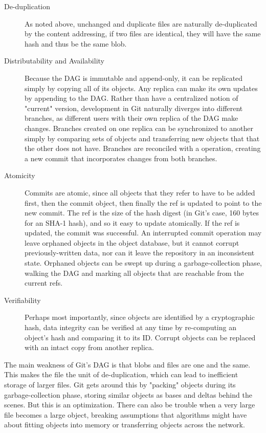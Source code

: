 \begin{description}

    \item[De-duplication] As noted above, unchanged and duplicate files are
        naturally de-duplicated by the content addressing, if two files are
        identical, they will have the same hash and thus be the same blob.

    \item[Distributability and Availability] Because the DAG is immutable and
        append-only, it can be replicated simply by copying all of its objects.
        Any replica can make its own updates by appending to the DAG. Rather
        than have a centralized notion of "current" version, development in Git
        naturally diverges into different branches, as different users with
        their own replica of the DAG make changes. Branches created on one
        replica can be synchronized to another simply by comparing sets of
        objects and transferring new objects that that the other does not have.
        Branches are reconciled with a  operation, creating a new
        commit that incorporates changes from both branches.

    \item[Atomicity] Commits are atomic, since all objects that they refer to
        have to be added first, then the commit object, then finally the ref is
        updated to point to the new commit. The ref is the size of the hash
        digest (in Git's case, \num{160} bytes for an SHA-1 hash), and so it
        easy to update atomically. If the ref is updated, the commit was
        successful. An interrupted commit operation may leave orphaned objects
        in the object database, but it cannot corrupt previously-written data,
        nor can it leave the repository in an inconsistent state. Orphaned
        objects can be swept up during a garbage-collection phase, walking the
        DAG and marking all objects that are reachable from the current refs.

    \item[Verifiability] Perhaps most importantly, since objects are identified
        by a cryptographic hash, data integrity can be verified at any time by
        re-computing an object's hash and comparing it to its ID. Corrupt
        objects can be replaced with an intact copy from another replica.

\end{description}

The main weakness of Git's DAG is that blobs and files are one and the same.
This makes the file the unit of de-duplication, which can lead to inefficient
storage of larger files. Git gets around this by "packing" objects during its
garbage-collection phase, storing similar objects as bases and deltas behind the
scenes. But this is an optimization. There can also be trouble when a very large
file becomes a large object, breaking assumptions that algorithms might have
about fitting objects into memory or transferring objects across the network.

